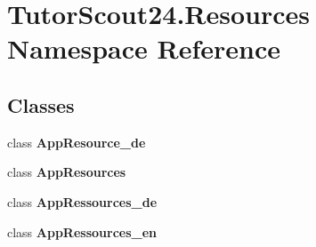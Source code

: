 \hypertarget{namespace_tutor_scout24_1_1_resources}{}\section{Tutor\+Scout24.\+Resources Namespace Reference}
\label{namespace_tutor_scout24_1_1_resources}
\subsection*{Classes}
\begin{DoxyCompactItemize}
\item 
class {\bfseries App\+Resource\+\_\+de}
\item 
class {\bfseries App\+Resources}
\item 
class {\bfseries App\+Ressources\+\_\+de}
\item 
class {\bfseries App\+Ressources\+\_\+en}
\end{DoxyCompactItemize}
